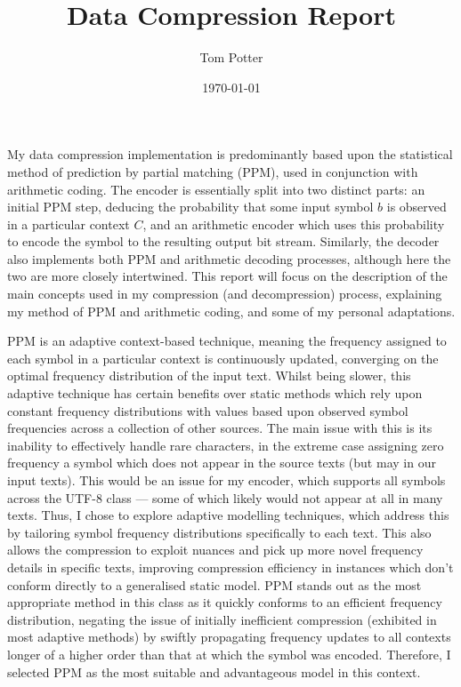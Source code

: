 \documentclass[a4paper, 11pt]{article}
\title{Data Compression Report}
\author{Tom Potter}
\date{\today}
\begin{document}
\maketitle

My data compression implementation is predominantly based upon the statistical method of prediction by partial matching (PPM), used in conjunction with arithmetic coding. The encoder is essentially split into two distinct parts: an initial PPM step, deducing the probability that some input symbol $b$ is observed in a particular context $C$, and an arithmetic encoder which uses this probability to encode the symbol to the resulting output bit stream. Similarly, the decoder also implements both PPM and arithmetic decoding processes, although here the two are more closely intertwined. This report will focus on the description of the main concepts used in my compression (and decompression) process, explaining my method of PPM and arithmetic coding, and some of my personal adaptations.

PPM is an adaptive context-based technique, meaning the frequency assigned to each symbol in a particular context is continuously updated, converging on the optimal frequency distribution of the input text. Whilst being slower, this adaptive technique has certain benefits over static methods which rely upon constant frequency distributions with values based upon observed symbol frequencies across a collection of other sources. The main issue with this is its inability to effectively handle rare characters, in the extreme case assigning zero frequency a symbol which does not appear in the source texts (but may in our input texts). This would be an issue for my encoder, which supports all symbols across the UTF-8 class --- some of which likely would not appear at all in many texts. Thus, I chose to explore adaptive modelling techniques, which address this by tailoring symbol frequency distributions specifically to each text. This also allows the compression to exploit nuances and pick up more novel frequency details in specific texts, improving  compression efficiency in instances which don't conform directly to a generalised static model. PPM stands out as the most appropriate method in this class as it quickly conforms to an efficient frequency distribution, negating the issue of initially inefficient compression (exhibited in most adaptive methods) by swiftly propagating frequency updates to all contexts longer of a higher order than that at which the symbol was encoded. Therefore, I selected PPM as the most suitable and advantageous model in this context.
\end{document}

